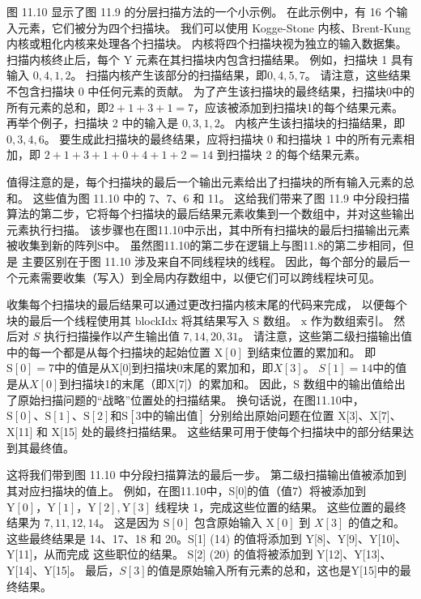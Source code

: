 图 11.10 显示了图 11.9 的分层扫描方法的一个小示例。 在此示例中，有 16 个输入元素，它们被分为四个扫描块。 
我们可以使用 Kogge-Stone 内核、Brent-Kung 内核或粗化内核来处理各个扫描块。 内核将四个扫描块视为独立的输入数据集。 
扫描内核终止后，每个 Y 元素在其扫描块内包含扫描结果。 例如，扫描块 1 具有输入 $0,4,1,2$。 
扫描内核产生该部分的扫描结果，即$0,4,5,7$。 请注意，这些结果不包含扫描块 0 中任何元素的贡献。 
为了产生该扫描块的最终结果，扫描块0中的所有元素的总和，即$2+1+3+1=7$，应该被添加到扫描块1的每个结果元素。 
再举个例子，扫描块 2 中的输入是 $0,3,1,2$。 内核产生该扫描块的扫描结果，即$0,3,4,6$。 
要生成此扫描块的最终结果，应将扫描块 0 和扫描块 1 中的所有元素相加，即 $2+1+3+1+0+4+1+2=14$ 到扫描块 2 的每个结果元素。

值得注意的是，每个扫描块的最后一个输出元素给出了扫描块的所有输入元素的总和。 这些值为图 11.10 中的 7、7、6 和 11。 
这给我们带来了图 11.9 中分段扫描算法的第二步，它将每个扫描块的最后结果元素收集到一个数组中，并对这些输出元素执行扫描。 
该步骤也在图11.10中示出，其中所有扫描块的最后扫描输出元素被收集到新的阵列S中。
虽然图11.10的第二步在逻辑上与图11.8的第二步相同，但是 主要区别在于图 11.10 涉及来自不同线程块的线程。 
因此，每个部分的最后一个元素需要收集（写入）到全局内存数组中，以便它们可以跨线程块可见。

收集每个扫描块的最后结果可以通过更改扫描内核末尾的代码来完成，
以便每个块的最后一个线程使用其 blockIdx 将其结果写入 $\mathrm{S}$ 数组。 $\mathrm{x}$ 作为数组索引。 
然后对 $S$ 执行扫描操作以产生输出值 $7,14,20,31$。 
请注意，这些第二级扫描输出值中的每一个都是从每个扫描块的起始位置 $\mathrm{X}[0]$ 到结束位置的累加和。 
即$\mathrm{S}[0]=7$中的值是从X[0]到扫描块0末尾的累加和，即$X[3]$。 $S[1]=14$中的值是从$X[0]$到扫描块1的末尾（即X[7]）的累加和。 因此，$\mathrm{S}$ 数组中的输出值给出了原始扫描问题的“战略”位置处的扫描结果。 
换句话说，在图11.10中，$\mathrm{S}[0]、\mathrm{S}[1]、\mathrm{S}[2]$和$\mathrm{S}[3中的输出值 ]$ 分别给出原始问题在位置 X[3]、X[7]、X[11] 和 X[15] 处的最终扫描结果。 这些结果可用于使每个扫描块中的部分结果达到其最终值。

这将我们带到图 11.10 中分段扫描算法的最后一步。 第二级扫描输出值被添加到其对应扫描块的值上。 
例如，在图11.10中，S[0]的值（值7）将被添加到$\mathrm{Y}[0]，\mathrm{Y}[1]，\mathrm{Y}[2] , \mathrm{Y}[3]$ 线程块 1，完成这些位置的结果。 这些位置的最终结果为 $7,11,12,14$。 
这是因为 $\mathrm{S}[0]$ 包含原始输入 $\mathrm{X}[0]$ 到 $X[3]$ 的值之和。 
这些最终结果是 14、17、18 和 20。S[1] (14) 的值将添加到 Y[8]、Y[9]、Y[10]、Y[11]，从而完成 这些职位的结果。 
S[2] (20) 的值将被添加到 Y[12]、Y[13]、Y[14]、Y[15]。 最后，$S[3]$的值是原始输入所有元素的总和，这也是Y[15]中的最终结果。

